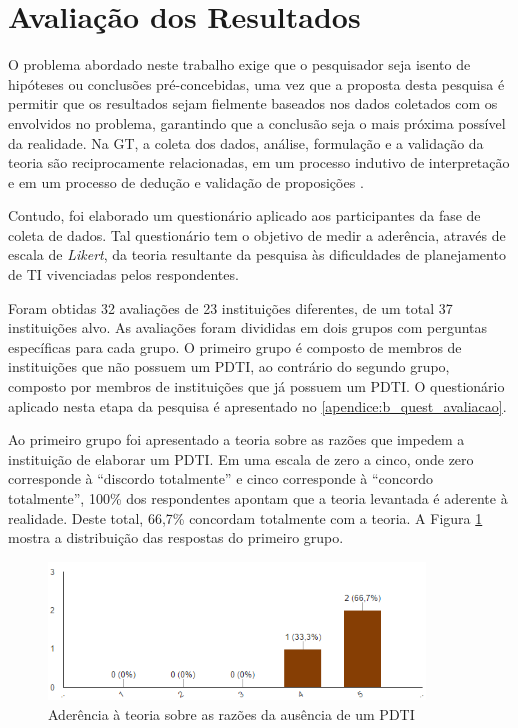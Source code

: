 \section{Avaliação dos Resultados}
\label{secao:avaliacao_resultados}
O problema abordado neste trabalho exige que o pesquisador seja isento de hipóteses ou conclusões pré-concebidas, uma vez que a proposta desta pesquisa é permitir que os resultados sejam fielmente baseados nos dados coletados com os envolvidos no problema, garantindo que a conclusão seja o mais próxima possível da realidade. Na GT, a coleta dos dados, análise, formulação e a validação da teoria são reciprocamente relacionadas, em um processo indutivo de interpretação e em um processo de dedução e validação de proposições \cite{bandeira:03}.

Contudo, foi elaborado um questionário aplicado aos participantes da fase de coleta de dados. Tal questionário tem o objetivo de medir a aderência, através de escala de \textit{Likert}, da teoria resultante da pesquisa às dificuldades de planejamento de TI vivenciadas pelos respondentes.

Foram obtidas 32 avaliações de 23 instituições diferentes, de um total 37 instituições alvo. As avaliações foram divididas em dois grupos com perguntas específicas para cada grupo. O primeiro grupo é composto de membros de instituições que não possuem um PDTI, ao contrário do segundo grupo, composto por membros de instituições que já possuem um PDTI. O questionário aplicado nesta etapa da pesquisa é apresentado no \autoref{apendice:b_quest_avaliacao}.

Ao primeiro grupo foi apresentado a teoria sobre as razões que impedem a instituição de elaborar um PDTI. Em uma escala de zero a cinco, onde zero corresponde à ``discordo totalmente'' e cinco corresponde à ``concordo totalmente'', 100\% dos respondentes apontam que a teoria levantada é aderente à realidade. Deste total, 66,7\% concordam totalmente com a teoria. A Figura \ref{figura:grafico_ava_grupoSemPDTI} mostra a distribuição das respostas do primeiro grupo.


\begin{figure}[h]
\centering %
\includegraphics[width=10cm, frame]{figuras/grafico_ava_grupoSemPDTI.PNG}
\caption{Aderência à teoria sobre as razões da ausência de um PDTI}
\label{figura:grafico_ava_grupoSemPDTI}
\end{figure}

